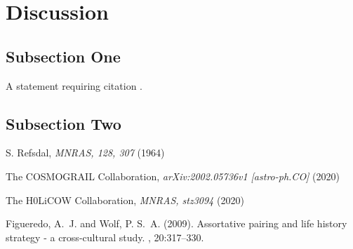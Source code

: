 \documentclass[twoside,twocolumn]{article}
\begin{document}
\section{Discussion}

\subsection{Subsection One}

A statement requiring citation \cite{Figueredo:2009dg}.
\blindtext %

\subsection{Subsection Two}

\blindtext %


\begin{thebibliography}{99} %

S. Refsdal,
\textit{MNRAS, 128, 307} (1964)

The COSMOGRAIL Collaboration,
\textit{arXiv:2002.05736v1 [astro-ph.CO]} (2020)

The H0LiCOW Collaboration,
\textit{MNRAS, stz3094} (2020)

Figueredo, A.~J. and Wolf, P. S.~A. (2009).
\newblock Assortative pairing and life history strategy - a cross-cultural
  study.
, 20:317--330.
 
\end{thebibliography}

\end{document}
